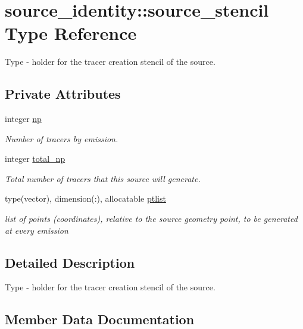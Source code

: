 \hypertarget{structsource__identity_1_1source__stencil}{}\section{source\+\_\+identity\+:\+:source\+\_\+stencil Type Reference}
\label{structsource__identity_1_1source__stencil}


Type -\/ holder for the tracer creation stencil of the source.  


\subsection*{Private Attributes}
\begin{DoxyCompactItemize}
\item 
integer \mbox{\hyperlink{structsource__identity_1_1source__stencil_a2d71d3aefbd9e69874f490ddae97ce64}{np}}
\begin{DoxyCompactList}\small\item\em Number of tracers by emission. \end{DoxyCompactList}\item 
integer \mbox{\hyperlink{structsource__identity_1_1source__stencil_a11f7462457253157db252466b51000f2}{total\+\_\+np}}
\begin{DoxyCompactList}\small\item\em Total number of tracers that this source will generate. \end{DoxyCompactList}\item 
type(vector), dimension(\+:), allocatable \mbox{\hyperlink{structsource__identity_1_1source__stencil_a91822da10e869f72071fa29e2bb2c080}{ptlist}}
\begin{DoxyCompactList}\small\item\em list of points (coordinates), relative to the source geometry point, to be generated at every emission \end{DoxyCompactList}\end{DoxyCompactItemize}


\subsection{Detailed Description}
Type -\/ holder for the tracer creation stencil of the source. 

\subsection{Member Data Documentation}
\mbox{\label{structsource__identity_1_1source__stencil_a2d71d3aefbd9e69874f490ddae97ce64}} 
